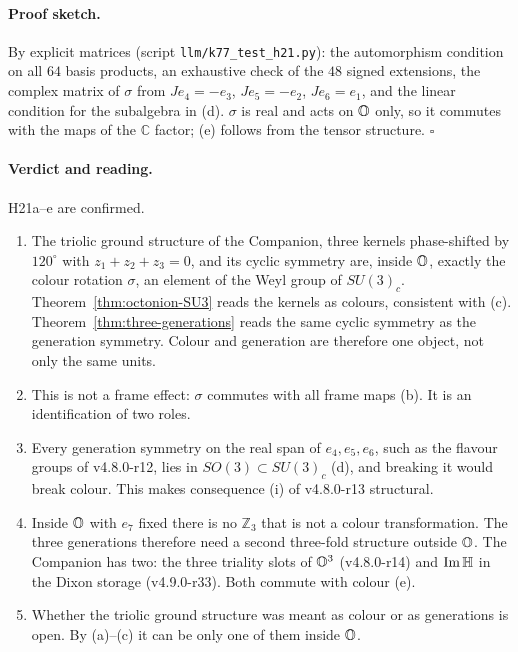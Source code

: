 \paragraph{Proof sketch.}
By explicit matrices (script \texttt{llm/k77\_test\_h21.py}): the automorphism condition on all \(64\) basis products, an exhaustive
check of the \(48\) signed extensions, the complex matrix of \(\sigma\) from \(Je_4=-e_3\), \(Je_5=-e_2\), \(Je_6=e_1\), and the
linear condition for the subalgebra in (d).  \(\sigma\) is real and acts on \(\mathbb{O}\) only, so it commutes with the maps of the
\(\mathbb C\) factor; (e) follows from the tensor structure.  \(\square\)

\paragraph{Verdict and reading.}
H21a--e are confirmed.
\begin{enumerate}[leftmargin=2em]
\item The triolic ground structure of the Companion, three kernels phase-shifted by \(120^\circ\) with \(z_1+z_2+z_3=0\), and its
cyclic symmetry are, inside \(\mathbb{O}\), exactly the colour rotation \(\sigma\), an element of the Weyl group of \(SU(3)_c\).
Theorem~\ref{thm:octonion-SU3} reads the kernels as colours, consistent with (c).  Theorem~\ref{thm:three-generations} reads the same
cyclic symmetry as the generation symmetry.  Colour and generation are therefore one object, not only the same units.
\item This is not a frame effect: \(\sigma\) commutes with all frame maps (b).  It is an identification of two roles.
\item Every generation symmetry on the real span of \(e_4,e_5,e_6\), such as the flavour groups of v4.8.0-r12, lies in
\(SO(3)\subset SU(3)_c\) (d), and breaking it would break colour.  This makes consequence (i) of v4.8.0-r13 structural.
\item Inside \(\mathbb{O}\) with \(e_7\) fixed there is no \(\mathbb Z_3\) that is not a colour transformation.  The three generations
therefore need a second three-fold structure outside \(\mathbb{O}\).  The Companion has two: the three triality slots of \(\mathbb{O}^3\)
(v4.8.0-r14) and \(\operatorname{Im}\mathbb{H}\) in the Dixon storage (v4.9.0-r33).  Both commute with colour (e).
\item Whether the triolic ground structure was meant as colour or as generations is open.  By (a)--(c) it can be only one of them
inside \(\mathbb{O}\).
\end{enumerate}

